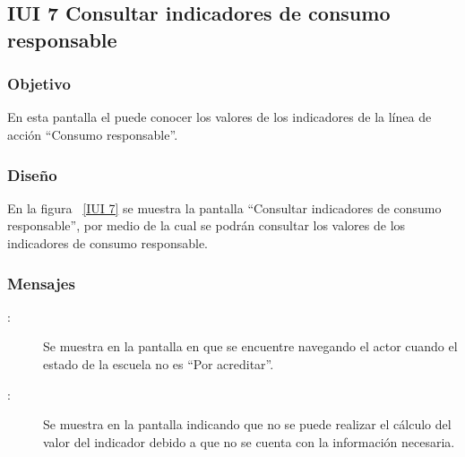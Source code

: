 \subsection{IUI 7 Consultar indicadores de consumo responsable}
\subsubsection{Objetivo}
	
	En esta pantalla el  puede conocer los valores de los indicadores
	de la línea de acción ``Consumo responsable''.	

\subsubsection{Diseño}

    En la figura ~\ref{IUI 7} se muestra la pantalla ``Consultar indicadores de consumo responsable'', por medio de la cual 
    se podrán consultar los valores de los indicadores de consumo responsable.


\subsubsection{Mensajes}

	
\begin{description}
	\item[:] Se muestra en la pantalla en que se encuentre navegando el actor cuando el estado de la escuela no es ``Por acreditar''.
	\item[:] Se muestra en la pantalla  indicando que no se puede realizar el cálculo del valor del indicador
				     debido a que no se cuenta con la información necesaria.
\end{description}

